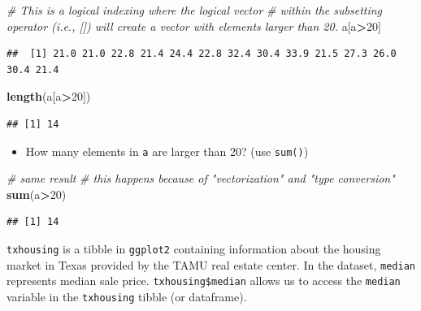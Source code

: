 \documentclass[]{book}
\newenvironment{Shaded}{\begin{snugshade}}{\end{snugshade}}
\newcommand{\CommentTok}[1]{\textcolor[rgb]{0.56,0.35,0.01}{\textit{#1}}}
\newcommand{\DecValTok}[1]{\textcolor[rgb]{0.00,0.00,0.81}{#1}}
\newcommand{\KeywordTok}[1]{\textcolor[rgb]{0.13,0.29,0.53}{\textbf{#1}}}
\newcommand{\NormalTok}[1]{#1}
\newcommand{\OperatorTok}[1]{\textcolor[rgb]{0.81,0.36,0.00}{\textbf{#1}}}
\newcommand{\StringTok}[1]{\textcolor[rgb]{0.31,0.60,0.02}{#1}}
\providecommand{\tightlist}{%
  \setlength{\itemsep}{0pt}\setlength{\parskip}{0pt}}
\begin{document}
\begin{Shaded}
\begin{Highlighting}[]
\CommentTok{# This is a logical indexing where the logical vector }
\CommentTok{# within the subsetting operator (i.e., []) will create a vector with elements larger than 20. }
\NormalTok{a[a}\OperatorTok{>}\DecValTok{20}\NormalTok{]}
\end{Highlighting}
\end{Shaded}

\begin{verbatim}
##  [1] 21.0 21.0 22.8 21.4 24.4 22.8 32.4 30.4 33.9 21.5 27.3 26.0 30.4 21.4
\end{verbatim}

\begin{Shaded}
\begin{Highlighting}[]
\KeywordTok{length}\NormalTok{(a[a}\OperatorTok{>}\DecValTok{20}\NormalTok{])}
\end{Highlighting}
\end{Shaded}

\begin{verbatim}
## [1] 14
\end{verbatim}

\begin{itemize}
\tightlist
\item
  How many elements in \texttt{a} are larger than 20? (use \texttt{sum()})
\end{itemize}

\begin{Shaded}
\begin{Highlighting}[]
\CommentTok{# same result}
\CommentTok{# this happens because of "vectorization" and "type conversion"}
\KeywordTok{sum}\NormalTok{(a}\OperatorTok{>}\DecValTok{20}\NormalTok{)}
\end{Highlighting}
\end{Shaded}

\begin{verbatim}
## [1] 14
\end{verbatim}

\texttt{txhousing} is a tibble in \texttt{ggplot2} containing information about the housing market in Texas provided by the TAMU real estate center. In the dataset, \texttt{median} represents median sale price. \texttt{txhousing\$median} allows us to access the \texttt{median} variable in the \texttt{txhousing} tibble (or dataframe).

\begin{Shaded}
\end{Shaded}
\end{document}
